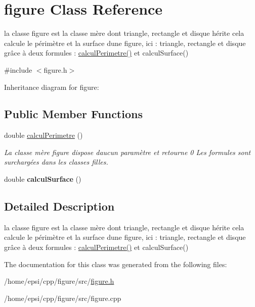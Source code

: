 \hypertarget{classfigure}{}\section{figure Class Reference}
\label{classfigure}


la classe figure est la classe mère dont triangle, rectangle et disque hérite cela calcule le périmètre et la surface d\textquotesingle{}une figure, ici \+: triangle, rectangle et disque grâce à deux formules \+: \hyperlink{classfigure_aa51e5f039d331cc59a7e73bcb72503d0}{calcul\+Perimetre()} et calcul\+Surface()  




{\ttfamily \#include $<$figure.\+h$>$}



Inheritance diagram for figure\+:
\subsection*{Public Member Functions}
\begin{DoxyCompactItemize}
\item 
\mbox{\label{classfigure_aa51e5f039d331cc59a7e73bcb72503d0}} 
double \hyperlink{classfigure_aa51e5f039d331cc59a7e73bcb72503d0}{calcul\+Perimetre} ()
\begin{DoxyCompactList}\small\item\em La classe mère figure dispose d\textquotesingle{}aucun paramètre et retourne 0 Les formules sont surchargées dans les classes filles. \end{DoxyCompactList}\item 
\mbox{\label{classfigure_ab40c5763713f27f26bd2b795d7b806ce}} 
double {\bfseries calcul\+Surface} ()
\end{DoxyCompactItemize}


\subsection{Detailed Description}
la classe figure est la classe mère dont triangle, rectangle et disque hérite cela calcule le périmètre et la surface d\textquotesingle{}une figure, ici \+: triangle, rectangle et disque grâce à deux formules \+: \hyperlink{classfigure_aa51e5f039d331cc59a7e73bcb72503d0}{calcul\+Perimetre()} et calcul\+Surface() 

The documentation for this class was generated from the following files\+:\begin{DoxyCompactItemize}
\item 
/home/epsi/cpp/figure/src/\hyperlink{figure_8h}{figure.\+h}\item 
/home/epsi/cpp/figure/src/figure.\+cpp\end{DoxyCompactItemize}
